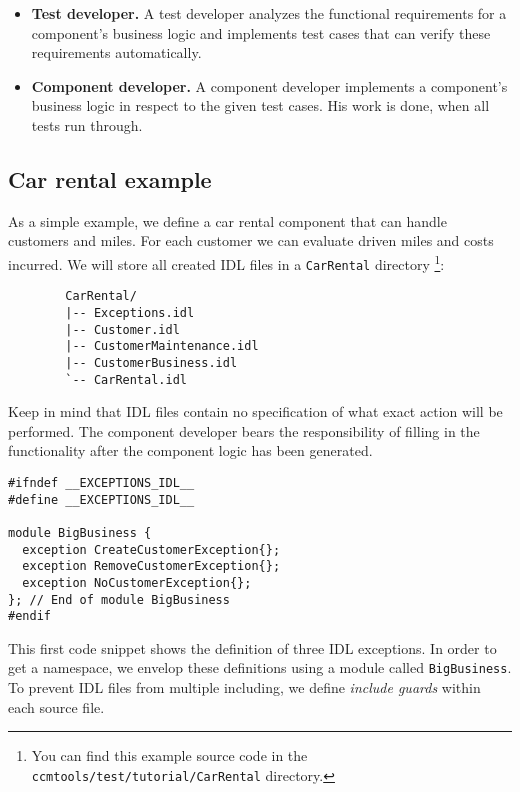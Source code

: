 \begin{itemize}
\item {\bf Test developer.}
A test developer analyzes the functional requirements for a component's 
business logic and implements test cases that can verify these requirements 
automatically.
 
\item {\bf Component developer.}
A component developer implements a component's business logic in respect to the
given test cases. His work is done, when all tests run through. 
\end{itemize}


\newpage
\subsection{Car rental example}

As a simple example, we define a car rental component that can handle customers
and miles. For each customer we can evaluate driven miles and costs incurred. 
We will store all created IDL files in a {\tt CarRental} directory
\footnote
{
You can find this example source code in the 
{\tt ccmtools/test/tutorial/CarRental} directory.}:
\begin{small}
\begin{verbatim}
        CarRental/
        |-- Exceptions.idl
        |-- Customer.idl
        |-- CustomerMaintenance.idl
        |-- CustomerBusiness.idl
        `-- CarRental.idl
\end{verbatim}
\end{small}

Keep in mind that IDL files contain no specification of what exact action will 
be performed.
The component developer bears the responsibility of filling in the functionality
after the component logic has been generated.

\begin{small}
\begin{verbatim}
#ifndef __EXCEPTIONS_IDL__
#define __EXCEPTIONS_IDL__

module BigBusiness {
  exception CreateCustomerException{};
  exception RemoveCustomerException{};
  exception NoCustomerException{};
}; // End of module BigBusiness
#endif
\end{verbatim}
\end{small}
This first code snippet shows the definition of three IDL exceptions.
In order to get a namespace, we envelop these definitions using a module called 
{\tt BigBusiness}. 
To prevent IDL files from multiple including, we define {\it include guards} 
within each source file.



